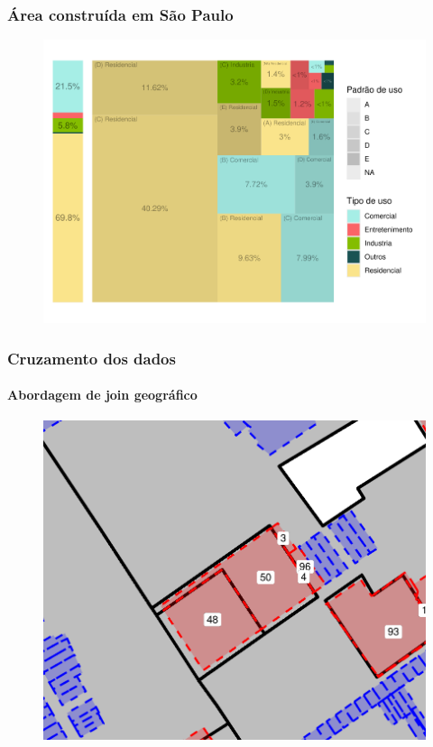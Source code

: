 \documentclass[%
    8pt, 
    aspectratio=169,
]{beamer}
\begin{document}
\begin{frame}
    \frametitle{Área construída em São Paulo}
    \begin{figure}
        \centering
        \includegraphics[height = .95\textheight]{imagens/tree_area_construida.pdf}
    \end{figure}
\end{frame}

\begin{frame}
    \frametitle{Cruzamento dos dados}
    \framesubtitle{Abordagem de join geográfico}

    \begin{figure}
        \centering
        \includegraphics[width = .6\linewidth]{imagens/corte_lote.pdf}
    \end{figure}
\end{frame}
\end{document}
